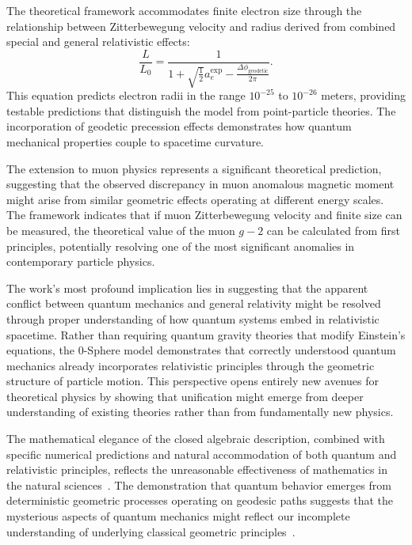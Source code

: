 \documentclass[%
 reprint,
 amsmath,amssymb,
 aps,
]{revtex4-1}
\numberwithin{equation}{section}%
\begin{document}
The theoretical framework accommodates finite electron size through the relationship between Zitterbewegung velocity and radius derived from combined special and general relativistic effects: \begin{equation}
\frac{L}{L_0} = \frac{1}{1 + \sqrt{\frac{1}{2}}a_e^{\exp} - \frac{\Delta\phi_{\text{geodetic}}}{2\pi}}.
\end{equation}
This equation predicts electron radii in the range $10^{-25}$ to $10^{-26}$ meters, providing testable predictions that distinguish the model from point-particle theories. The incorporation of geodetic precession effects demonstrates how quantum mechanical properties couple to spacetime curvature.

The extension to muon physics represents a significant theoretical prediction, suggesting that the observed discrepancy in muon anomalous magnetic moment might arise from similar geometric effects operating at different energy scales. The framework indicates that if muon Zitterbewegung velocity and finite size can be measured, the theoretical value of the muon $g-2$ can be calculated from first principles, potentially resolving one of the most significant anomalies in contemporary particle physics.

The work's most profound implication lies in suggesting that the apparent conflict between quantum mechanics and general relativity might be resolved through proper understanding of how quantum systems embed in relativistic spacetime. Rather than requiring quantum gravity theories that modify Einstein's equations, the 0-Sphere model demonstrates that correctly understood quantum mechanics already incorporates relativistic principles through the geometric structure of particle motion. This perspective opens entirely new avenues for theoretical physics by showing that unification might emerge from deeper understanding of existing theories rather than from fundamentally new physics.

The mathematical elegance of the closed algebraic description, combined with specific numerical predictions and natural accommodation of both quantum and relativistic principles, reflects the unreasonable effectiveness of mathematics in the natural sciences~\cite{wigner1960}. The demonstration that quantum behavior emerges from deterministic geometric processes operating on geodesic paths suggests that the mysterious aspects of quantum mechanics might reflect our incomplete understanding of underlying classical geometric principles~\cite{misner1973}.
\end{document}
